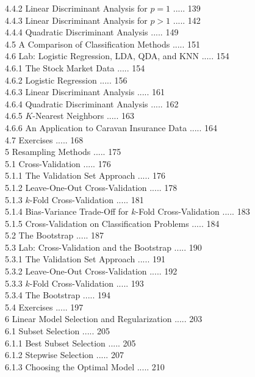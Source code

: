 \documentclass[10pt]{article}
\begin{document}
4.4.2 Linear Discriminant Analysis for $p=1$ ..... 139\\
4.4.3 Linear Discriminant Analysis for $p>1$ ..... 142\\
4.4.4 Quadratic Discriminant Analysis ..... 149\\
4.5 A Comparison of Classification Methods ..... 151\\
4.6 Lab: Logistic Regression, LDA, QDA, and KNN ..... 154\\
4.6.1 The Stock Market Data ..... 154\\
4.6.2 Logistic Regression ..... 156\\
4.6.3 Linear Discriminant Analysis ..... 161\\
4.6.4 Quadratic Discriminant Analysis ..... 162\\
4.6.5 $K$-Nearest Neighbors ..... 163\\
4.6.6 An Application to Caravan Insurance Data ..... 164\\
4.7 Exercises ..... 168\\
5 Resampling Methods ..... 175\\
5.1 Cross-Validation ..... 176\\
5.1.1 The Validation Set Approach ..... 176\\
5.1.2 Leave-One-Out Cross-Validation ..... 178\\
5.1.3 $k$-Fold Cross-Validation ..... 181\\
5.1.4 Bias-Variance Trade-Off for $k$-Fold Cross-Validation ..... 183\\
5.1.5 Cross-Validation on Classification Problems ..... 184\\
5.2 The Bootstrap ..... 187\\
5.3 Lab: Cross-Validation and the Bootstrap ..... 190\\
5.3.1 The Validation Set Approach ..... 191\\
5.3.2 Leave-One-Out Cross-Validation ..... 192\\
5.3.3 $k$-Fold Cross-Validation ..... 193\\
5.3.4 The Bootstrap ..... 194\\
5.4 Exercises ..... 197\\
6 Linear Model Selection and Regularization ..... 203\\
6.1 Subset Selection ..... 205\\
6.1.1 Best Subset Selection ..... 205\\
6.1.2 Stepwise Selection ..... 207\\
6.1.3 Choosing the Optimal Model ..... 210\\
\end{document}

